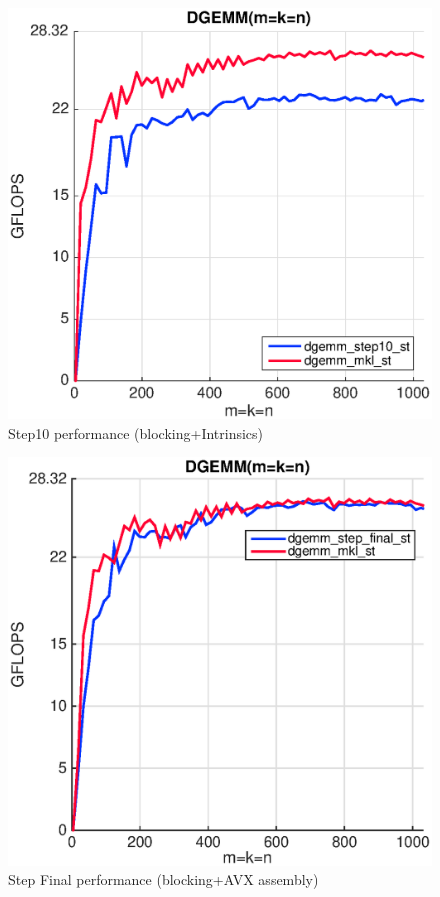 \begin{figure}[!htp]
  \centering
  \includegraphics[scale=.5]{figures/step10_single_thread_ivy.eps}
  \caption{Step10 performance (blocking+Intrinsics)}
  \label{fig:int}
\end{figure} 

\begin{figure}[!htp]
  \centering
  \includegraphics[scale=.5]{figures/step_final_single_thread_ivy.eps}
  \caption{Step Final performance (blocking+AVX assembly)}
  \label{fig:final}
\end{figure} 


